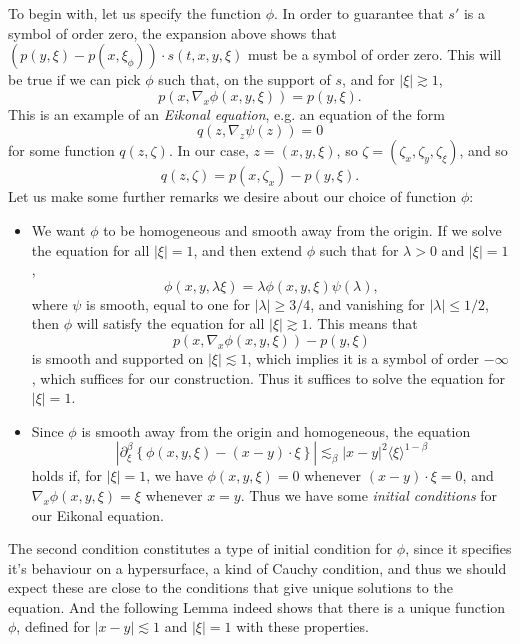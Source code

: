 To begin with, let us specify the function $\phi$. In order to guarantee that $s'$ is a symbol of order zero, the expansion above shows that $(p(y,\xi) - p(x,\xi_\phi)) \cdot s(t,x,y,\xi)$ must be a symbol of order zero. This will be true if we can pick $\phi$ such that, on the support of $s$, and for $|\xi| \gtrsim 1$,
%
\[ p(x, \nabla_x \phi(x,y,\xi)) = p(y,\xi). \]
%
This is an example of an \emph{Eikonal equation}, e.g. an equation of the form
%
\[ q(z,\nabla_z \psi(z)) = 0 \]
%
for some function $q(z,\zeta)$. In our case, $z = (x,y,\xi)$, so $\zeta = (\zeta_x, \zeta_y,\zeta_\xi)$, and so
%
\[ q(z,\zeta) = p(x,\zeta_x) - p(y,\xi). \]
%
Let us make some further remarks we desire about our choice of function $\phi$:
%
\begin{itemize}
    \item We want $\phi$ to be homogeneous and smooth away from the origin. If we solve the equation for all $|\xi| = 1$, and then extend $\phi$ such that for $\lambda > 0$ and $|\xi| = 1$,
    \[ \phi(x,y,\lambda \xi) = \lambda \phi(x,y,\xi) \psi(\lambda), \]
    where $\psi$ is smooth, equal to one for $|\lambda| \geq 3/4$, and vanishing for $|\lambda| \leq 1/2$, then $\phi$ will satisfy the equation for all $|\xi| \gtrsim 1$. This means that
    \[ p(x,\nabla_x \phi(x,y,\xi)) - p(y,\xi) \]
    is smooth and supported on $|\xi| \lesssim 1$, which implies it is a symbol of order $-\infty$, which suffices for our construction. Thus it suffices to solve the equation for $|\xi| = 1$.

    \item Since $\phi$ is smooth away from the origin and homogeneous, the equation
    \[ |\partial_\xi^\beta \left\{ \phi(x,y,\xi) - (x - y) \cdot \xi \right\}| \lesssim_\beta |x - y|^2 \langle \xi \rangle^{1 - \beta} \]
    holds if, for $|\xi| = 1$, we have $\phi(x,y,\xi) = 0$ whenever $(x - y) \cdot \xi = 0$, and $\nabla_x \phi(x,y,\xi) = \xi$ whenever $x = y$. Thus we have some \emph{initial conditions} for our Eikonal equation.
\end{itemize}
%
The second condition constitutes a type of initial condition for $\phi$, since it specifies it's behaviour on a hypersurface, a kind of Cauchy condition, and thus we should expect these are close to the conditions that give unique solutions to the equation. And the following Lemma indeed shows that there is a unique function $\phi$, defined for $|x - y| \lesssim 1$ and $|\xi| = 1$ with these properties.

